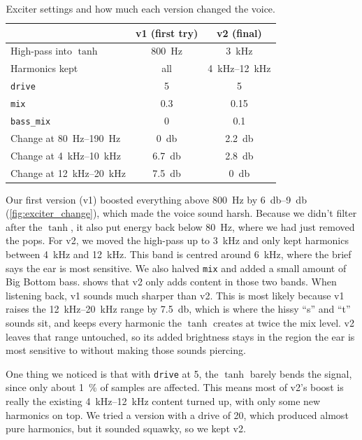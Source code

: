 \documentclass[11pt,a4paper]{article}
\begin{document}
\begin{table}[htbp]
  \centering
  \caption{Exciter settings and how much each version changed the voice.}
  \label{tab:exciter}
  \begin{tabular}{@{}lcc@{}}
    \toprule
    & v1 (first try) & v2 (final) \\
    \midrule
    High-pass into $\tanh$ & \SI{800}{\hertz} & \SI{3}{\kilo\hertz} \\
    Harmonics kept & all & \SIrange{4}{12}{\kilo\hertz} \\
    \texttt{drive} & 5 & 5 \\
    \texttt{mix} & 0.3 & 0.15 \\
    \texttt{bass\_mix} & 0 & 0.1 \\
    \midrule
    Change at \SIrange{80}{190}{\hertz} & \SI{0}{\decibel} & \SI{+2.2}{\decibel} \\
    Change at \SIrange{4}{10}{\kilo\hertz} & \SI{+6.7}{\decibel} & \SI{+2.8}{\decibel} \\
    Change at \SIrange{12}{20}{\kilo\hertz} & \SI{+7.5}{\decibel} & \SI{0}{\decibel} \\
    \bottomrule
  \end{tabular}
\end{table}

Our first version (v1) boosted everything above \SI{800}{\hertz} by
\SIrange{6}{9}{\decibel} (\cref{fig:exciter_change}), which made the voice
sound harsh. Because we didn't filter after the $\tanh$, it also put energy
back below \SI{80}{\hertz}, where we had just removed the pops. For v2, we
moved the high-pass up to \SI{3}{\kilo\hertz} and only kept harmonics between
\SI{4}{\kilo\hertz} and \SI{12}{\kilo\hertz}. This band is centred around
\SI{6}{\kilo\hertz}, where the brief says the ear is most sensitive. We also
halved \texttt{mix} and added a small amount of Big Bottom bass.
 shows that v2 only adds content in those two bands.
When listening back, v1 sounds much sharper than v2. This is most likely
because v1 raises the \SIrange{12}{20}{\kilo\hertz} range by
\SI{7.5}{\decibel}, which is where the hissy ``s'' and ``t'' sounds sit, and
keeps every harmonic the $\tanh$ creates at twice the mix level. v2 leaves
that range untouched, so its added brightness stays in the region the ear is
most sensitive to without making those sounds piercing.

One thing we noticed is that with \texttt{drive} at 5, the $\tanh$ barely
bends the signal, since only about \SI{1}{\percent} of samples are affected.
This means most of v2's boost is really the existing
\SIrange{4}{12}{\kilo\hertz} content turned up, with only some new harmonics
on top. We tried a version with a drive of 20, which produced almost pure
harmonics, but it sounded squawky, so we kept v2.
\end{document}

